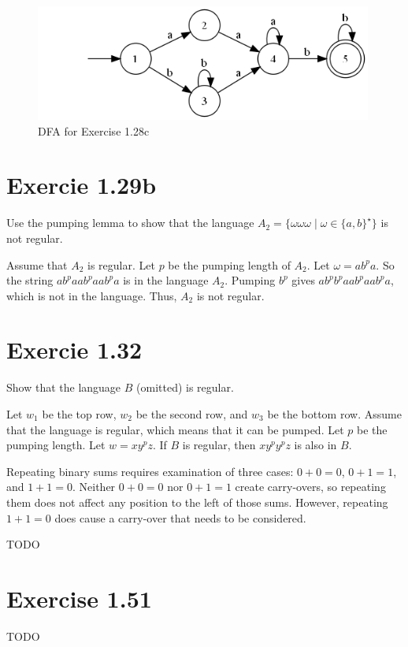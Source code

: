 \documentclass{article}
\newcommand{\where}{\mid}
\begin{document}
\begin{figure}[h!]
	\centering
	\includegraphics[height=1.5in]{1_28.png}
	\caption{DFA for Exercise 1.28c}
\end{figure}

\section{Exercie 1.29b}

Use the pumping lemma to show that the language $A_2 = \{ \omega \omega \omega
\where \omega \in \{a, b\}^\star \}$ is not regular.

Assume that $A_2$ is regular. Let $p$ be the pumping length of $A_2$. Let
$\omega = ab^pa$. So the string $ab^paab^paab^pa$ is in the language $A_2$.
Pumping $b^p$ gives $ab^pb^paab^paab^pa$, which is not in the language. Thus,
$A_2$ is not regular.

\section{Exercie 1.32}

Show that the language $B$ (omitted) is regular.

Let $w_1$ be the top row, $w_2$ be the second row, and $w_3$ be the bottom row.
Assume that the language is regular, which means that it can be pumped. Let
$p$ be the pumping length. Let $w = xy^pz$. If $B$ is regular, then $xy^py^pz$
is also in $B$.

Repeating binary sums requires examination of three cases: $0 + 0 = 0$, $0 + 1
= 1$, and $1 + 1 = 0$. Neither $0 + 0 = 0$ nor $0 + 1 = 1$ create carry-overs,
so repeating them does not affect any position to the left of those sums.
However, repeating $1 + 1 = 0$ does cause a carry-over that needs to be
considered.

TODO

\section{Exercise 1.51}

TODO
\end{document}
